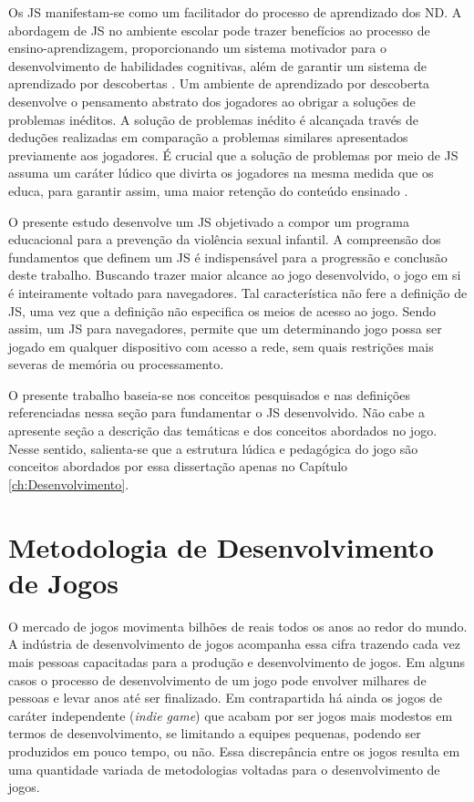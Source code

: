 Os \ac{JS} manifestam-se como um facilitador do processo de aprendizado dos \ac{ND}. A abordagem de \ac{JS} no ambiente escolar pode trazer benefícios ao processo de ensino-aprendizagem, proporcionando um sistema motivador para o desenvolvimento de habilidades cognitivas, além de garantir um sistema de aprendizado por descobertas \cite{carvalho2017move4math}. Um ambiente de aprendizado por descoberta desenvolve o pensamento abstrato dos jogadores ao obrigar a soluções de problemas inéditos. A solução de problemas inédito é alcançada través de deduções realizadas em comparação a problemas similares apresentados previamente aos jogadores. É crucial que a solução de problemas por meio de \ac{JS} assuma um caráter lúdico que divirta os jogadores na mesma medida que os educa, para garantir assim, uma maior retenção do conteúdo ensinado \cite{tarouco2004jogos}. 

O presente estudo desenvolve um \ac{JS} objetivado a compor um programa educacional para a prevenção da violência sexual infantil. A compreensão dos fundamentos que definem um \ac{JS} é indispensável para a progressão e conclusão deste trabalho. Buscando trazer maior alcance ao jogo desenvolvido, o jogo em si é inteiramente voltado para navegadores. Tal característica não fere a definição de \ac{JS}, uma vez que a definição não especifica os meios de acesso ao jogo. Sendo assim, um \ac{JS} para navegadores, permite que um determinando jogo possa ser jogado em qualquer dispositivo com acesso a rede, sem quais restrições mais severas de memória ou processamento. 

O presente trabalho baseia-se nos conceitos pesquisados e nas definições referenciadas nessa seção para fundamentar o \ac{JS} desenvolvido. Não cabe a apresente seção a descrição das temáticas e dos conceitos abordados no jogo. Nesse sentido, salienta-se que a estrutura lúdica e pedagógica do jogo são conceitos abordados por essa dissertação apenas no Capítulo \ref{ch:Desenvolvimento}.


\section{Metodologia de Desenvolvimento de Jogos}\label{sec:Engenharia}

O mercado de jogos movimenta bilhões de reais todos os anos ao redor do mundo. A indústria de desenvolvimento de jogos acompanha essa cifra trazendo cada vez mais pessoas capacitadas para a produção e desenvolvimento de jogos. Em alguns casos o processo de desenvolvimento de um jogo pode envolver milhares de pessoas e levar anos até ser finalizado. Em contrapartida há ainda os jogos de caráter independente (\textit{indie game}) que acabam por ser jogos mais modestos em termos de desenvolvimento, se limitando a equipes pequenas, podendo ser produzidos em pouco tempo, ou não. Essa discrepância entre os jogos resulta em uma quantidade variada de metodologias voltadas para o desenvolvimento de jogos.


